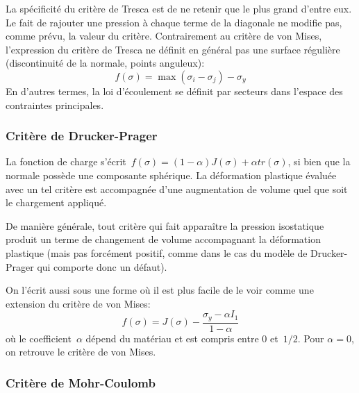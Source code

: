 La spécificité du critère de Tresca est de ne retenir que le plus grand d'entre eux. Le fait de rajouter une pression à chaque terme de la diagonale ne modifie pas, comme prévu, la valeur du critère. Contrairement au critère de von Mises, l'expression du critère de Tresca ne définit en général pas une surface régulière (discontinuité de la normale, points anguleux):
\begin{equation} f(\sigma) = \max(\sigma_i - \sigma_j) - \sigma_y \end{equation}
En d'autres termes, la loi d'écoulement se définit par secteurs dans l'espace des contraintes principales.


\medskip
\subsubsection{Critère de Drucker-Prager}


\medskip
La fonction de charge s'écrit~$f(\sigma)=(1-\alpha)J(\sigma)+\alpha tr(\sigma)$, si
bien que la normale possède une composante sphérique. La déformation plastique évaluée avec un tel critère est accompagnée d'une augmentation de volume quel que soit le chargement appliqué.

De manière générale, tout critère qui fait apparaître la pression isostatique produit un terme de changement de volume accompagnant la déformation plastique (mais pas forcément positif, comme dans le cas du modèle de Drucker-Prager qui comporte donc un défaut).

On l'écrit aussi sous une forme où il est plus facile de le voir comme une extension du critère de von Mises: 
\begin{equation} f(\sigma) = J(\sigma) - \dfrac{\sigma_y-\alpha I_1}{1-\alpha} \end{equation}
où le coefficient~$\alpha$ dépend du matériau et est compris entre 0 et~$1/2$. Pour $\alpha=0$, on retrouve le critère de von Mises.

\medskip
\subsubsection{Critère de Mohr-Coulomb}

